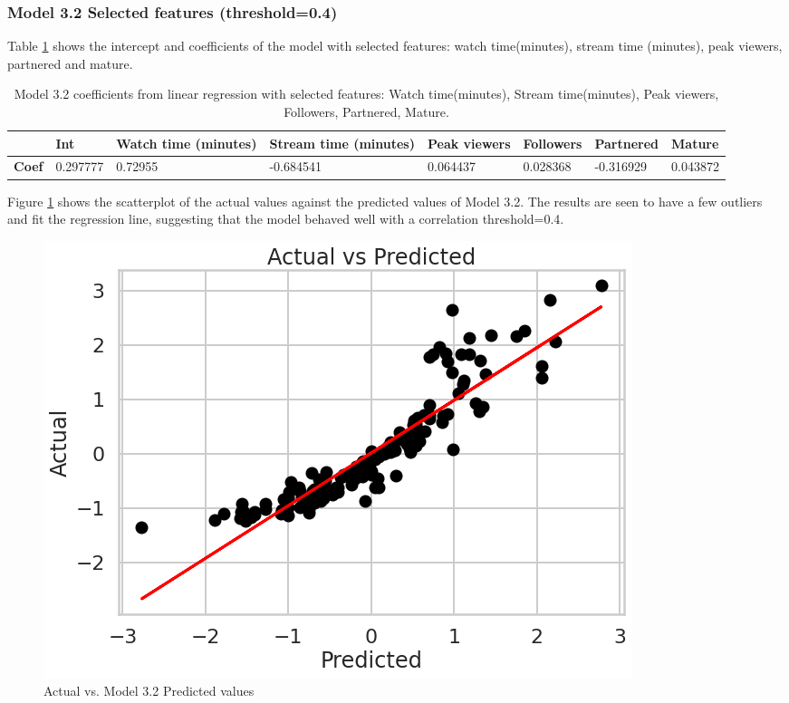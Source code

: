 \documentclass[runningheads]{llncs}
\begin{document}
\subsubsection{Model 3.2 Selected features (threshold=0.4)}

Table \ref{tab:model3_2} shows the intercept and coefficients of the model with selected features: watch time(minutes), stream time (minutes), peak viewers, partnered and mature. \\

\begingroup
\setlength{\tabcolsep}{5pt} %
\renewcommand{\arraystretch}{1} %
\begin{table}[h]
    \centering
    \caption{Model 3.2 coefficients from linear regression with selected features: Watch time(minutes), Stream time(minutes), Peak viewers, Followers, Partnered, Mature.}
    \begin{tabular}{|p{.08\linewidth}|p{.12\linewidth}|p{.15\linewidth}|p{.15\linewidth}|p{.10\linewidth}|p{.12\linewidth}|p{.14\linewidth}|p{.12\linewidth}|}
        \hline
      & \textbf{Int} & \textbf{Watch time (minutes)} & \textbf{Stream time (minutes)} &	\textbf{Peak viewers}	& \textbf{Followers}  & \textbf{Partnered} & \textbf{Mature} \\
     \hline
    \textbf{Coef} & 0.297777 &	0.72955 & 	-0.684541 & 0.064437 & 	0.028368 & 	-0.316929	& 0.043872 \\
   \hline
    \end{tabular}
    \label{tab:model3_2}
\end{table}
\endgroup 

Figure \ref{fig:model3_2} shows the scatterplot of the actual values against the predicted values of Model 3.2. The results are seen to have a few outliers and fit the regression line, suggesting that the model behaved well with a correlation threshold=0.4. \\

\begin{figure}[h]
    \centering
    \includegraphics[width=0.6\linewidth]{figures/graphs/model_3_2_graph.png}
    \caption{Actual vs. Model 3.2 Predicted values }
  \label{fig:model3_2}
\end{figure}
\end{document}

